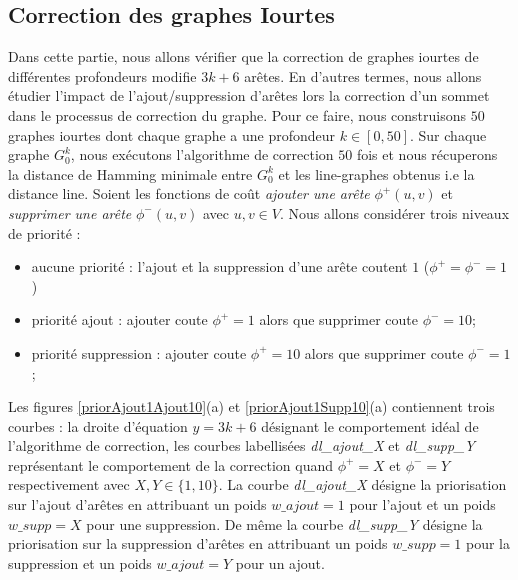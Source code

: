 \documentclass[onecolumn, 12pt]{book}
\begin{document}
\subsection{Correction des graphes Iourtes}
Dans cette partie, nous allons v\'erifier que la correction de graphes iourtes de diff\'erentes profondeurs modifie $3k+6$ ar\^etes.
 En d'autres termes, nous allons \'etudier l'impact de l'ajout/suppression d'ar\^etes lors la correction d'un sommet dans le processus de correction du graphe.
Pour ce faire, nous construisons $50$ graphes iourtes dont chaque graphe a une profondeur $k \in [0,50]$.
Sur chaque graphe $G_0^k$, nous ex\'ecutons  l'algorithme de correction  $50$ fois et nous r\'ecuperons la distance de Hamming minimale entre $G_0^k$ et les line-graphes obtenus i.e la distance line.
\newline
Soient les fonctions de co\^ut  {\em ajouter une ar\^ete} $\phi^{+}(u,v)$ et {\em supprimer une ar\^ete} $\phi^{-}(u,v)$ avec $u,v \in V$.
Nous allons consid\'erer trois niveaux de priorit\'e :
\begin{itemize}
	\item aucune priorit\'e : l'ajout et la suppression d'une ar\^ete coutent $1$ ($\phi^{+} = \phi^{-} = 1$)
	\item priorit\'e ajout : ajouter coute $\phi^{+} = 1$ alors que supprimer coute $\phi^{-} = 10$; 
	\item priorit\'e suppression : ajouter coute $\phi^{+} = 10$ alors que supprimer coute $\phi^{-} = 1$; 
\end{itemize}
Les figures \ref{priorAjout1Ajout10}(a)  et \ref{priorAjout1Supp10}(a) contiennent trois courbes : la droite d'\'equation $y = 3k+6$ d\'esignant le comportement id\'eal de l'algorithme de correction, les courbes labellis\'ees {\em dl\_ajout\_X} et {\em dl\_supp\_Y}  repr\'esentant le comportement de la correction quand $\phi^{+} = X$ et $\phi^{-} = Y$ respectivement avec $X, Y \in \{1,10\}$. 
La courbe  {\em dl\_ajout\_X} d\'esigne la priorisation sur l'ajout d'ar\^etes en attribuant un poids $w\_ajout = 1$ pour l'ajout et un poids $w\_supp = X$ pour une suppression.
De m\^eme la  courbe  {\em dl\_supp\_Y} d\'esigne la priorisation sur la suppression d'ar\^etes en attribuant un poids $w\_supp = 1$ pour la suppression et un poids $w\_ajout = Y$ pour un ajout.
\end{document}
